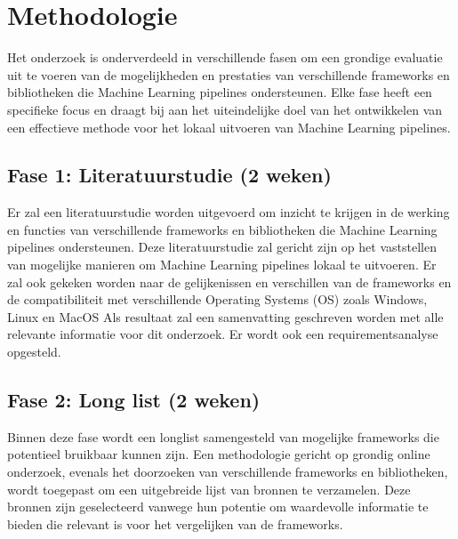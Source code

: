 

\section{Methodologie}%
\label{sec:methodologie}
Het onderzoek is onderverdeeld in verschillende fasen om een grondige evaluatie uit te voeren van de mogelijkheden en prestaties van verschillende frameworks en bibliotheken die Machine Learning pipelines ondersteunen. Elke fase heeft een specifieke focus en draagt bij aan het uiteindelijke doel van het ontwikkelen van een effectieve methode voor het lokaal uitvoeren van Machine Learning pipelines.
\subsection{Fase 1: Literatuurstudie (2 weken)}
Er zal een literatuurstudie worden uitgevoerd om inzicht te krijgen in de werking en
functies van verschillende frameworks en bibliotheken die Machine Learning pipelines ondersteunen.
Deze literatuurstudie zal gericht zijn op het vaststellen van mogelijke manieren om Machine Learning pipelines lokaal te uitvoeren. Er zal ook gekeken worden naar de gelijkenissen en verschillen van de frameworks en de compatibiliteit met verschillende Operating Systems (OS) zoals Windows, Linux en MacOS
Als resultaat zal een samenvatting geschreven worden met alle relevante informatie voor dit onderzoek.
Er wordt ook een requirementsanalyse opgesteld.\\
\subsection{Fase 2: Long list (2 weken)}
Binnen deze fase wordt een longlist samengesteld van mogelijke frameworks die potentieel bruikbaar kunnen zijn. Een methodologie gericht op grondig online onderzoek, evenals het doorzoeken van verschillende frameworks en bibliotheken, wordt toegepast om een uitgebreide lijst van bronnen te verzamelen. Deze bronnen zijn geselecteerd vanwege hun potentie om waardevolle informatie te bieden die relevant is voor het vergelijken van de frameworks.
